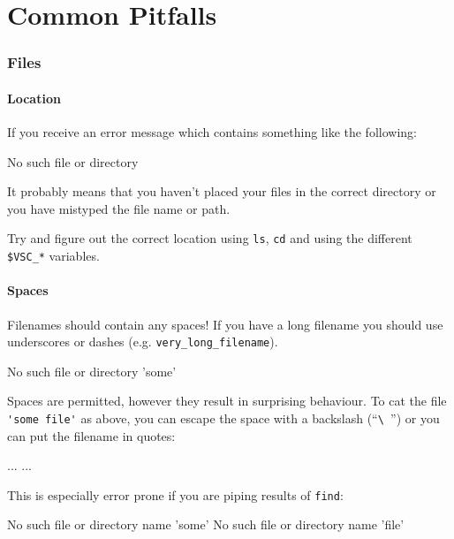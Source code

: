 \chapter{Common Pitfalls}

\subsection{Files}

\subsubsection{Location}
If you receive an error message which contains something like the following:

\begin{prompt}
No such file or directory
\end{prompt}

It probably means that you haven't placed your files in the correct directory or
you have mistyped the file name or path.

Try and figure out the correct location using \lstinline|ls|, \lstinline|cd| and using the
different \lstinline|$VSC_*| variables.

\subsubsection{Spaces}

Filenames should  contain any spaces! If you have a long filename
you should use underscores or dashes (e.g. \lstinline|very_long_filename|).

\begin{prompt}
No such file or directory 'some'
\end{prompt}

Spaces are permitted, however they result in surprising behaviour. To cat the
file \lstinline|'some file'| as above, you can escape the space with a backslash (``\lstinline|\ |'')
or you can put the filename in quotes:

\begin{prompt}
...
...
\end{prompt}

This is especially error prone if you are piping results of \lstinline|find|:

\begin{prompt}
No such file or directory name 'some'
No such file or directory name 'file'
\end{prompt}

